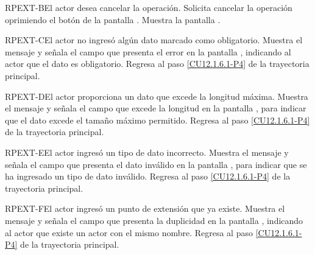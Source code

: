	\begin{UCtrayectoriaA}{RPEXT-B}{El actor desea cancelar la operación.}
		\UCpaso[\UCactor] Solicita cancelar la operación oprimiendo el botón  de la pantalla .
		\UCpaso[\UCsist] Muestra la pantalla .
	\end{UCtrayectoriaA}

	\begin{UCtrayectoriaA}{RPEXT-C}{El actor no ingresó algún dato marcado como obligatorio.}
		\UCpaso[\UCsist] Muestra el mensaje  y señala el campo que presenta el error en la pantalla , indicando al actor que el dato es obligatorio.
		\UCpaso Regresa al paso \ref{CU12.1.6.1-P4} de la trayectoria principal.
	\end{UCtrayectoriaA}

	\begin{UCtrayectoriaA}{RPEXT-D}{El actor proporciona un dato que excede la longitud máxima.}
		\UCpaso[\UCsist] Muestra el mensaje  y señala el campo que excede la longitud en la pantalla , para indicar que el dato excede el tamaño máximo permitido.
		\UCpaso Regresa al paso \ref{CU12.1.6.1-P4} de la trayectoria principal.
	\end{UCtrayectoriaA}

	\begin{UCtrayectoriaA}{RPEXT-E}{El actor ingresó un tipo de dato incorrecto.}
		\UCpaso[\UCsist] Muestra el mensaje  y señala el campo que presenta el dato inválido en la pantalla , para indicar que se ha ingresado un tipo de dato inválido.
		\UCpaso Regresa al paso \ref{CU12.1.6.1-P4} de la trayectoria principal.
	\end{UCtrayectoriaA}
	
	\begin{UCtrayectoriaA}{RPEXT-F}{El actor ingresó un punto de extensión que ya existe.}
		\UCpaso[\UCsist] Muestra el mensaje  y señala el campo que presenta la duplicidad en la pantalla , indicando al actor que existe un actor con el mismo nombre.
		\UCpaso Regresa al paso \ref{CU12.1.6.1-P4} de la trayectoria principal.
	\end{UCtrayectoriaA}

